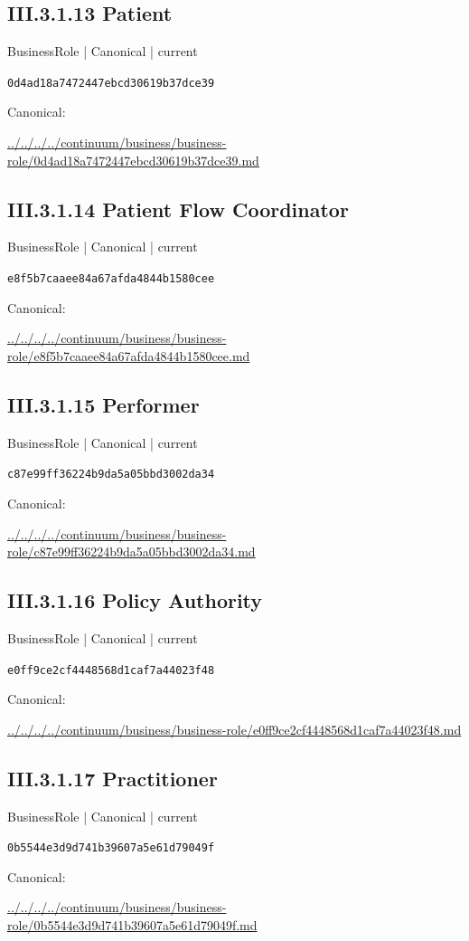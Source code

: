 \documentclass[10pt,a4paper]{article}
\begin{document}
\subsection*{III.3.1.13 Patient}
{\small BusinessRole | Canonical | current}\par
\texttt{0d4ad18a7472447ebcd30619b37dce39}\par
Canonical: \par
{\footnotesize\url{../../../../continuum/business/business-role/0d4ad18a7472447ebcd30619b37dce39.md}}\par
\subsection*{III.3.1.14 Patient Flow Coordinator}
{\small BusinessRole | Canonical | current}\par
\texttt{e8f5b7caaee84a67afda4844b1580cee}\par
Canonical: \par
{\footnotesize\url{../../../../continuum/business/business-role/e8f5b7caaee84a67afda4844b1580cee.md}}\par
\subsection*{III.3.1.15 Performer}
{\small BusinessRole | Canonical | current}\par
\texttt{c87e99ff36224b9da5a05bbd3002da34}\par
Canonical: \par
{\footnotesize\url{../../../../continuum/business/business-role/c87e99ff36224b9da5a05bbd3002da34.md}}\par
\subsection*{III.3.1.16 Policy Authority}
{\small BusinessRole | Canonical | current}\par
\texttt{e0ff9ce2cf4448568d1caf7a44023f48}\par
Canonical: \par
{\footnotesize\url{../../../../continuum/business/business-role/e0ff9ce2cf4448568d1caf7a44023f48.md}}\par
\subsection*{III.3.1.17 Practitioner}
{\small BusinessRole | Canonical | current}\par
\texttt{0b5544e3d9d741b39607a5e61d79049f}\par
Canonical: \par
{\footnotesize\url{../../../../continuum/business/business-role/0b5544e3d9d741b39607a5e61d79049f.md}}\par
\end{document}
